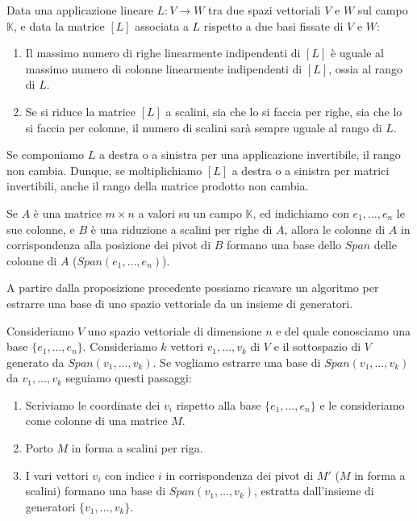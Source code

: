 \begin{theorem}
	Data una applicazione lineare $L : V \to W$ tra due spazi vettoriali $V$ e
	$W$ sul campo $\mathbb{K}$, e data la matrice $[L]$ associata a $L$ rispetto
	a due basi fissate di $V$ e $W$:
	\begin{enumerate}
		\item Il massimo numero di righe linearmente indipendenti di $[L]$ \`e
		      uguale al massimo numero di colonne linearmente indipendenti di
		      $[L]$, ossia al rango di $L$.
		\item Se si riduce la matrice $[L]$ a scalini, sia che lo si faccia
		      per righe, sia che lo si faccia per colonne, il numero di scalini
		      sar\`a sempre uguale al rango di $L$.
	\end{enumerate}
\end{theorem}

\begin{observation}
	Se componiamo $L$ a destra o a sinistra per una	applicazione invertibile,
	il rango non cambia. Dunque, se moltiplichiamo $[L]$ a destra o a sinistra
	per matrici invertibili, anche il rango della matrice prodotto non cambia.
\end{observation}

\begin{proposition}
	Se $A$ \`e una matrice $m \times n$ a valori su un campo $\mathbb{K}$, ed
	indichiamo con $e_1, \dots, e_n$ le sue colonne, e $B$ \`e una riduzione
	a scalini per righe di $A$, allora le colonne di $A$ in corrispondenza alla
	posizione dei pivot di $B$ formano una base dello $Span$ delle colonne di $A$
	($Span(e_1, \dots, e_n)$).
\end{proposition}

\begin{observation}
	A partire dalla proposizione precedente possiamo ricavare un algoritmo per
	estrarre una base di uno spazio vettoriale da un insieme di generatori.

	Consideriamo $V$ uno spazio vettoriale di dimensione $n$ e del quale
	conosciamo una base $\{e_1, \dots, e_n\}$. Consideriamo $k$ vettori
	$v_1, \dots, v_k$ di $V$ e il sottospazio di $V$ generato da
	$Span(v_1, \dots, v_k)$. Se vogliamo estrarre una base di
	$Span(v_1, \dots, v_k)$ da $v_1, \dots, v_k$ seguiamo questi passaggi:
	\begin{enumerate}
		\item Scriviamo le coordinate dei $v_i$ rispetto alla base
		      $\{e_1, \dots, e_n\}$ e le	consideriamo come colonne di
		      una matrice $M$.
		\item Porto $M$ in forma a scalini per riga.
		\item I vari vettori $v_i$ con indice $i$ in corrispondenza dei pivot di $M'$
		      ($M$ in forma a scalini) formano una base di $Span(v_1, \dots, v_k)$,
		      estratta dall'insieme di generatori $\{v_1, \dots, v_k\}$.
	\end{enumerate}
\end{observation}